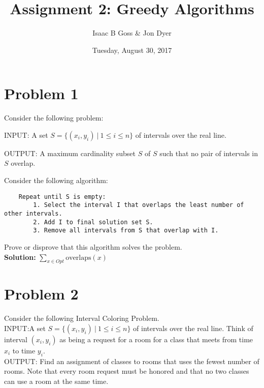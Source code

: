\documentclass{article}
\author{Isaac B Goss \& Jon Dyer}
\title{Assignment 2: Greedy Algorithms}
\date{Tuesday, August 30, 2017}
\providecommand{\soln}{\textbf{Solution: }}
\begin{document}
\maketitle

    \section*{Problem 1}
    Consider the following problem:
    
    INPUT: A set $S = \{(x_i, y_i)\ |\ 1 \leq i \leq n\}$ of intervals over the real line.
    
    OUTPUT: A maximum cardinality subset $S$ of $S$ such that no pair of intervals in $S$ overlap.
        
    Consider the following algorithm:
    
    \begin{lstlisting}
    Repeat until S is empty:
        1. Select the interval I that overlaps the least number of other intervals.
        2. Add I to final solution set S.
        3. Remove all intervals from S that overlap with I.
    \end{lstlisting}

    Prove or disprove that this algorithm solves the problem.\\
    
    \soln $\displaystyle \sum_{x \in Opt} \text{overlaps}(x) $
    
    \section*{Problem 2}
    
    Consider the following Interval Coloring Problem.\\
    INPUT:A set $S = \{(x_i, y_i)\ |\ 1 \leq i \leq n\}$ of intervals over the real line. Think of interval $(x_i, y_i)$ as being a request for a room for a class that meets from time $x_i$ to time $y_i$.\\
    OUTPUT: Find an assignment of classes to rooms that uses the fewest number of rooms.
    Note that every room request must be honored and that no two classes can use a room at the same
    time.
    
\end{document}

